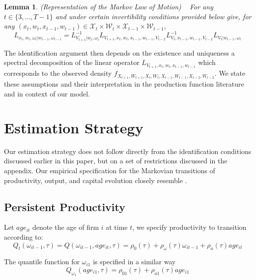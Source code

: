 \documentclass{article}
\newtheorem{lemma}{Lemma}[section]
\begin{document}
\begin{lemma} (Representation of the Markov Law of Motion)
~
For any $t\in\{3,\dots, T-1\}$ and under certain invertibility conditions provided below give, for any $(x_{t}, w_{t}, x_{t-1}, w_{t-1})\in \mathcal{X}_{t}\times \mathcal{W}_{t}\times \mathcal{X}_{t-1}\times \mathcal{W}_{t-1}$,
\begin{equation}\label{markovoperator}
L_{x_{t},w_{t},\omega_{t}|w_{t-1},\omega_{t-1}}=L^{-1}_{V_{t+1}|w_{t},\omega_{t}}L_{V_{t+1},x_{t},w_{t},x_{t-1}, w_{t-1}, V_{t-2}}L^{-1}_{V_{t},x_{t-1},w_{t-1},V_{t-2}}L_{V_{t}|w_{t-1},\omega_{t}}
\end{equation}
\end{lemma}

The identification argument then depends on the existence and uniqueness a spectral decomposition of the linear operator $L_{V_{t+1},x_{t}, w_{t}, x_{t-1}, w_{t-1}}$ which corresponds to the observed density $f_{X_{t+1}, W_{t+1}, X_{t}, W_{t}, X_{t-1}, W_{t-1}, X_{t-2}, W_{t-2}}$. We state these assumptions and their interpretation in the production function literature and in context of our model.




\section{Estimation Strategy}
Our estimation strategy does not follow directly from the identification conditions discussed earlier in this paper, but on a set of restrictions discussed in the appendix. Our empirical specification for the Markovian transitions of productivity, output, and capital evolution closely resemble \cite{Arellano2017}. 
\subsection{Persistent Productivity}
Let $age_{it}$ denote the age of firm $i$ at time $t$, we specify productivity to transition according to:
\begin{equation}\label{omegamodel}
Q_{t}(\omega_{it-1}, \tau)=Q(\omega_{it-1}, age_{it}, \tau)=\rho_{0}(\tau)+\rho_{\omega}(\tau)\omega_{it-1}+\rho_{a}(\tau)age_{it}
\end{equation}

\noindent The quantile function for $\omega_{i1}$ is specified in a similar way
\begin{equation}
\label{omega1model}
Q_{\omega_{1}}(age_{i1}, \tau)=\rho_{01}(\tau)+\rho_{a1}(\tau)age_{i1}
\end{equation}
\end{document}
